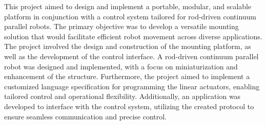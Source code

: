 \par This project aimed to design and implement a portable, modular, and scalable platform in conjunction with a control system tailored for rod-driven continuum parallel robots. The primary objective was to develop a versatile mounting solution that would facilitate efficient robot movement across diverse applications. The project involved the design and construction of the mounting platform, as well as the development of the control interface. A rod-driven continuum parallel robot was designed and implemented, with a focus on miniaturization and enhancement of the structure. Furthermore, the project aimed to implement a customized language specification for programming the linear actuators, enabling tailored control and operational flexibility. Additionally, an application was developed to interface with the control system, utilizing the created protocol to ensure seamless communication and precise control.